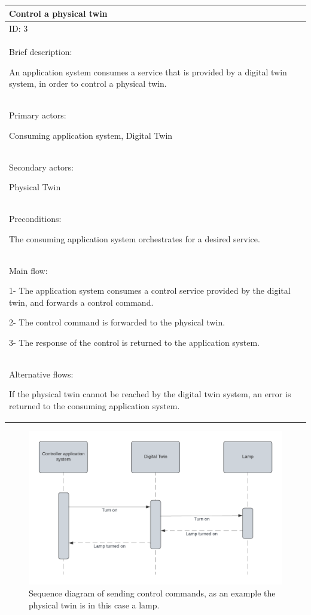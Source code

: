 \documentclass{article}
\begin{document}
\begin{flushleft}
\tablefirsthead{}
\tablehead{}
\tabletail{}
\tablelasttail{}
\begin{supertabular}{|m{6.01226in}|}
\hline
Control a physical twin\\\hline
ID: 3 \\\hline
Brief description:

An application system consumes a service that is provided by a digital twin system, in order to control a physical twin. \\\hline

Primary actors:

Consuming application system, Digital Twin \\\hline
Secondary actors:

Physical Twin \\\hline
Preconditions:

The consuming application system orchestrates for a desired service. \\\hline
Main flow:

1- The application system consumes a control service provided by the digital twin, and forwards a control command.

2- The control command is forwarded to the physical twin.

3- The response of the control is returned to the application system.

\\\hline
Alternative flows:

If the physical twin cannot be reached by the digital twin system, an error is returned to the consuming application system.\\\hline
\end{supertabular}
\end{flushleft}

\begin{figure}[H]
    \centering
    \includegraphics[width=\textwidth,height=\textheight,keepaspectratio]{./figures/Controller-Sequence.png}
    \caption{Sequence diagram of sending control commands, as an example the physical twin is in this case a lamp.}
    \label{fig:control-sequence}
\end{figure}
\end{document}
